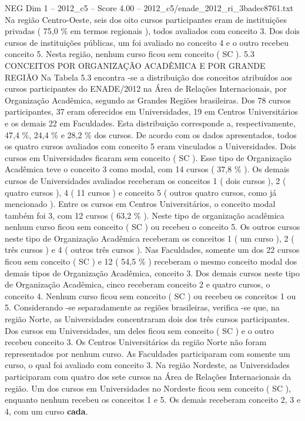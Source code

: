 \begin{textsample}{NEG Dim 1 – 2012\_c5 – Score 4.00 – 2012\_c5/enade\_2012\_ri\_3badec8761.txt}
Na região Centro-Oeste, seis dos oito cursos participantes eram de instituições privadas ( 75,0 \% em termos regionais ), todos avaliados com conceito 3.
Dos dois cursos de instituições públicas, um foi avaliado no conceito 4 e o outro recebeu conceito 5.
Nesta região, nenhum curso ficou sem conceito ( SC ). 5.3 CONCEITOS POR ORGANIZAÇÃO ACADÊMICA E POR GRANDE REGIÃO Na Tabela 5.3 encontra -se a distribuição dos conceitos atribuídos aos cursos participantes do ENADE/2012 na Área de Relações Internacionais, por Organização Acadêmica, segundo as Grandes Regiões brasileiras.
Dos 78 cursos participantes, 37 eram oferecidos em Universidades, 19 em Centros Universitários e os demais 22 em Faculdades.
Esta distribuição corresponde a, respectivamente, 47,4 \%, 24,4 \% e 28,2 \% dos cursos.
De acordo com os dados apresentados, todos os quatro cursos avaliados com conceito 5 eram vinculados a Universidades.
Dois cursos em Universidades ficaram sem conceito ( SC ).
Esse tipo de Organização Acadêmica teve o conceito 3 como modal, com 14 cursos ( 37,8 \% ).
Os demais cursos de Universidades avaliados receberam os conceitos 1 ( dois cursos ), 2 ( quatro cursos ), 4 ( 11 cursos ) e conceito 5 ( outros quatro cursos, como já mencionado ).
Entre os cursos em Centros Universitários, o conceito modal também foi 3, com 12 cursos ( 63,2 \% ).
Neste tipo de organização acadêmica nenhum curso ficou sem conceito ( SC ) ou recebeu o conceito 5.
Os outros cursos neste tipo de Organização Acadêmica receberam os conceitos 1 ( um curso ), 2 ( três cursos ) e 4 ( outros três cursos ).
Nas Faculdades, somente um dos 22 cursos ficou sem conceito ( SC ) e 12 ( 54,5 \% ) receberam o mesmo conceito modal dos demais tipos de Organização Acadêmica, conceito 3.
Dos demais cursos neste tipo de Organização Acadêmica, cinco receberam conceito 2 e quatro cursos, o conceito 4.
Nenhum curso ficou sem conceito ( SC ) ou recebeu os conceitos 1 ou 5.
Considerando -se separadamente as regiões brasileiras, verifica -se que, na região Norte, as Universidades concentraram dois dos três cursos participantes.
Dos cursos em Universidades, um deles ficou sem conceito ( SC ) e o outro recebeu conceito 3.
Os Centros Universitários da região Norte não foram representados por nenhum curso.
As Faculdades participaram com somente um curso, o qual foi avaliado com conceito 3.
Na região Nordeste, as Universidades participaram com quatro dos sete cursos na Área de Relações Internacionais da região.
Um dos cursos em Universidades no Nordeste ficou sem conceito ( SC ), enquanto nenhum recebeu os conceitos 1 e 5.
Os demais receberam conceito 2, 3 e 4, com um curso \textbf{cada}.

\end{textsample}

